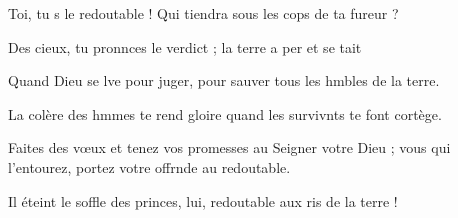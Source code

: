 \item Toi, tu s le redoutable !\psstar{} Qui tiendra sous les cops de ta fureur ?
\item Des cieux, tu pronnces le verdict ;\psstar{} la terre a per et se tait
\item Quand Dieu se lve pour juger,\psstar{} pour sauver tous les hmbles de la terre.
\item La colère des hmmes te rend gloire\psstar{} quand les survivnts te font cortège.
\item Faites des vœux et tenez vos promesses au Seigner votre Dieu ;\psstar{} vous qui l’entourez, portez votre offrnde au redoutable.
\item Il éteint le soffle des princes,\psstar{} lui, redoutable aux ris de la terre !